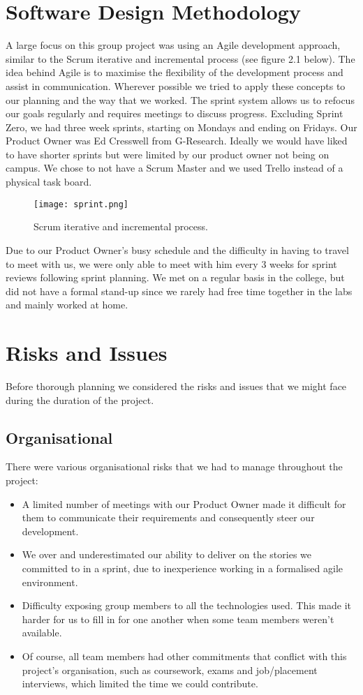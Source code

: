 \section{Software Design Methodology}
A large focus on this group project was using an Agile development approach, similar to the Scrum iterative and incremental process (see figure 2.1 below). The idea behind Agile is to maximise the flexibility of the development process and assist in communication. Wherever possible we tried to apply these concepts to our planning and the way that we worked. The sprint system allows us to refocus our goals regularly and requires meetings to discuss progress. Excluding Sprint Zero\cite{boa}, we had three week sprints, starting on Mondays and ending on Fridays. Our Product Owner was Ed Cresswell from G-Research.  Ideally we would have liked to have shorter sprints but were limited by our product owner not being on campus. We chose to not have a Scrum Master and we used Trello\cite{trello} instead of a physical task board.

\begin{figure}[H]
\centering
\texttt{[image: sprint.png]}
\caption{Scrum iterative and incremental process.}
\label{fig:scrum}
\end{figure}

Due to our Product Owner's busy schedule and the difficulty in having to travel to meet with us, we were only able to meet with him every 3 weeks for sprint reviews following sprint planning. We met on a regular basis in the college, but did not have a formal stand-up since we rarely had free time together in the labs and mainly worked at home.


\section{Risks and Issues}
Before thorough planning we considered the risks and issues that we might face during the duration of the project.
\subsection{Organisational}
There were various organisational risks that we had to manage throughout the project:
\begin{itemize}
\item A limited number of meetings with our Product Owner made it difficult for them to communicate their requirements and consequently steer our development.
\item We over and underestimated our ability to deliver on the stories we committed to in a sprint, due to inexperience working in a formalised agile environment.
\item Difficulty exposing group members to all the technologies used. This made it harder for us to fill in for one another when some team members weren't available.
\item Of course, all team members had other commitments that conflict with this project's organisation, such as coursework, exams and job/placement interviews, which limited the time we could contribute.
\end{itemize}


